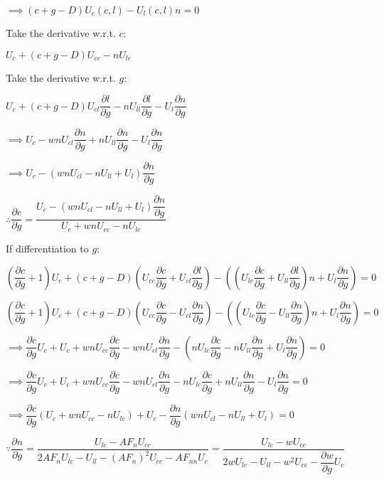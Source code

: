 \documentclass{article}
\begin{document}
$\implies\left(c+g-D\right)U_{c}\left(c,l\right)-U_{l}\left(c,l\right)n=0$

Take the derivative w.r.t. $c$:

$U_{c}+\left(c+g-D\right)U_{cc}-nU_{lc}$

Take the derivative w.r.t. $g$:

$U_{c}+\left(c+g-D\right)U_{cl}\dfrac{\partial l}{\partial g}-nU_{ll}\dfrac{\partial l}{\partial g}-U_{l}\dfrac{\partial n}{\partial g}$

$\implies U_{c}-wnU_{cl}\dfrac{\partial n}{\partial g}+nU_{ll}\dfrac{\partial n}{\partial g}-U_{l}\dfrac{\partial n}{\partial g}$

$\implies U_{c}-\left(wnU_{cl}-nU_{ll}+U_{l}\right)\dfrac{\partial n}{\partial g}$

$\therefore \dfrac{\partial c}{\partial g}=\dfrac{U_{c}-\left(wnU_{cl}-nU_{ll}+U_{l}\right)\dfrac{\partial n}{\partial g}}{U_{c}+wnU_{cc}-nU_{lc}}$

If differentiation to $g$:

$\left(\dfrac{\partial c}{\partial g}+1\right)U_{c}+\left(c+g-D\right)\left(U_{cc}\dfrac{\partial c}{\partial g}+U_{cl}\dfrac{\partial l}{\partial g}\right)-\left(\left(U_{lc}\dfrac{\partial c}{\partial g}+U_{ll}\dfrac{\partial l}{\partial g}\right)n+U_{l}\dfrac{\partial n}{\partial g}\right)=0$

$\left(\dfrac{\partial c}{\partial g}+1\right)U_{c}+\left(c+g-D\right)\left(U_{cc}\dfrac{\partial c}{\partial g}-U_{cl}\dfrac{\partial n}{\partial g}\right)-\left(\left(U_{lc}\dfrac{\partial c}{\partial g}-U_{ll}\dfrac{\partial n}{\partial g}\right)n+U_{l}\dfrac{\partial n}{\partial g}\right)=0$

$\implies\dfrac{\partial c}{\partial g}U_{c}+U_{c}+wnU_{cc}\dfrac{\partial c}{\partial g}-wnU_{cl}\dfrac{\partial n}{\partial g}-\left(nU_{lc}\dfrac{\partial c}{\partial g}-nU_{ll}\dfrac{\partial n}{\partial g}+U_{l}\dfrac{\partial n}{\partial g}\right)=0$

$\implies\dfrac{\partial c}{\partial g}U_{c}+U_{c}+wnU_{cc}\dfrac{\partial c}{\partial g}-wnU_{cl}\dfrac{\partial n}{\partial g}-nU_{lc}\dfrac{\partial c}{\partial g}+nU_{ll}\dfrac{\partial n}{\partial g}-U_{l}\dfrac{\partial n}{\partial g}=0$

$\implies\dfrac{\partial c}{\partial g}\left(U_{c}+wnU_{cc}-nU_{lc}\right)+U_{c}-\dfrac{\partial n}{\partial g}\left(wnU_{cl}-nU_{ll}+U_{l}\right)=0$

$\because \dfrac{\partial n}{\partial g}=\dfrac{U_{lc}-AF_{n}U_{cc}}{2AF_{n}U_{lc}-U_{ll}-\left(AF_{n}\right)^2U_{cc}-AF_{nn}U_{c}}=\dfrac{U_{lc}-wU_{cc}}{2wU_{lc}-U_{ll}-w^{2}U_{cc}-\dfrac{\partial w}{\partial g}U_{c}}$
\end{document}
